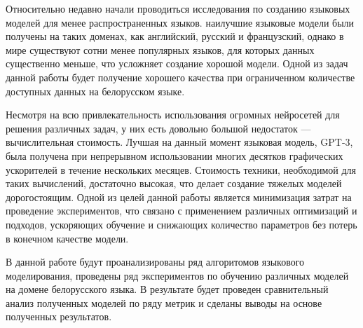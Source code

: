 Относительно недавно начали проводиться исследования по созданию языковых моделей для менее распространенных языков. наилучшие языковые модели были получены на таких доменах, как английский, русский и французский, однако в мире существуют сотни менее популярных языков, для которых данных существенно меньше, что усложняет создание хорошой модели. Одной из задач данной работы будет получение хорошего качества при ограниченном количестве доступных данных на белорусском языке.

Несмотря на всю привлекательность использования огромных нейросетей для решения различных задач, у них есть довольно большой недостаток --- вычислительная стоимость. Лучшая на данный момент языковая модель, GPT-3, была получена при непрерывном использовании многих десятков графических ускорителей в течение нескольких месяцев. Стоимость техники, необходимой для таких вычислений, достаточно высокая, что делает создание тяжелых моделей дорогостоящим. Одной из целей данной работы является минимизация затрат на проведение экспериментов, что связано с применением различных оптимизаций и подходов, ускоряющих обучение и снижающих количество параметров без потерь в конечном качестве модели.

В данной работе будут проанализированы ряд алгоритомов языкового моделирования, проведены ряд экспериментов по обучению различных моделей на домене белорусского языка. В результате будет проведен сравнительный анализ полученных моделей по ряду метрик и сделаны выводы на основе полученных результатов.

